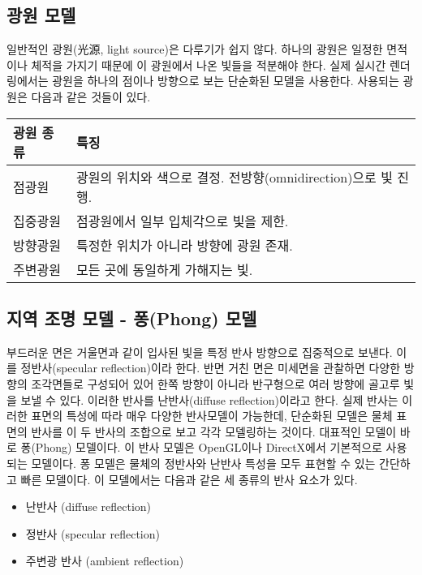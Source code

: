 \subsection{광원 모델}

일반적인 광원(光源, light source)은 다루기가 쉽지 않다. 하나의 광원은 일정한 면적이나 체적을 가지기 때문에 이 광원에서 나온 빛들을 적분해야 한다.
실제 실시간 렌더링에서는 광원을 하나의 점이나 방향으로 보는 단순화된 모델을 사용한다. 사용되는 광원은 다음과 같은 것들이 있다.

\begin{center}
    \begin{tabular}{ |l| p{12cm} |}
    \hline
    {\small \sf \bf 광원 종류} & {\small \sf \bf 특징} \\ \hline
    {\small \sf 점광원} & {\small \sf 광원의 위치와 색으로 결정. 전방향(omnidirection)으로 빛 진행.}\\ \hline
    {\small \sf 집중광원 } & {\small \sf 점광원에서 일부 입체각으로 빛을 제한.}\\ \hline
    {\small \sf 방향광원 } & {\small \sf 특정한 위치가 아니라 방향에 광원 존재.} \\ \hline
    {\small \sf 주변광원 } & {\small \sf 모든 곳에 동일하게 가해지는 빛.}\\ \hline
    \end{tabular}
\end{center}

\subsection{지역 조명 모델 - 퐁(Phong) 모델}

부드러운 면은 거울면과 같이 입사된 빛을 특정 반사 방향으로 집중적으로 보낸다. 이를 정반사(specular reflection)이라 한다. 
반면 거친 면은 미세면을 관찰하면 다양한 방향의 조각면들로 구성되어 있어 한쪽 방향이 아니라 반구형으로 여러 방향에 골고루 빛을 보낼 수 있다.
 이러한 반사를 난반사(diffuse reflection)이라고 한다. 실제 반사는 이러한 표면의 특성에 따라 매우 다양한 반사모델이 가능한데, 
단순화된 모델은 물체 표면의 반사를 이 두 반사의 조합으로 보고 각각 모델링하는 것이다. 대표적인 모델이 바로 퐁(Phong) 모델이다. 
이 반사 모델은 OpenGL이나 DirectX에서 기본적으로 사용되는 모델이다. 
퐁 모델은 물체의 정반사와 난반사 특성을 모두 표현할 수 있는 간단하고 빠른 모델이다. 이 모델에서는 다음과 같은 세 종류의 반사 요소가 있다.

\begin{itemize}
\item 난반사 (diffuse reflection)
\item 정반사 (specular reflection)
\item 주변광 반사 (ambient reflection)
\end{itemize}

